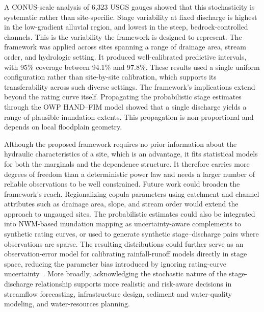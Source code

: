 \documentclass[11pt]{article}
\begin{document}
A CONUS-scale analysis of 6,323 USGS gauges showed that this stochasticity is systematic rather than site-specific. Stage variability at fixed discharge is highest in the low-gradient alluvial region, and lowest in the steep, bedrock-controlled channels. This is the variability the framework is designed to represent. The framework was applied across sites spanning a range of drainage area, stream order, and hydrologic setting. It produced well-calibrated predictive intervals, with 95\% coverage between 94.1\% and 97.8\%. These results used a single uniform configuration rather than site-by-site calibration, which supports its transferability across such diverse settings.
The framework's implications extend beyond the rating curve itself. Propagating the probabilistic stage estimates through the OWP HAND--FIM model showed that a single discharge yields a range of plausible inundation extents. This propagation is non-proportional and depends on local floodplain geometry.

Although the proposed framework requires no prior information about the hydraulic characteristics of a site, which is an advantage, it fits statistical models for both the marginals and the dependence structure. It therefore carries more degrees of freedom than a deterministic power law and needs a larger number of reliable observations to be well constrained.
Future work could broaden the framework's reach. Regionalizing copula parameters using catchment and channel attributes such as drainage area, slope, and stream order would extend the approach to ungauged sites. The probabilistic estimates could also be integrated into NWM-based inundation mapping as uncertainty-aware complements to synthetic rating curves, or used to generate synthetic stage--discharge pairs where observations are sparse. The resulting distributions could further serve as an observation-error model for calibrating rainfall-runoff models directly in stage space, reducing the parameter bias introduced by ignoring rating-curve uncertainty~\citep{sikorska2017}. More broadly, acknowledging the stochastic nature of the stage-discharge relationship supports more realistic and risk-aware decisions in streamflow forecasting, infrastructure design, sediment and water-quality modeling, and water-resources planning.
\end{document}

